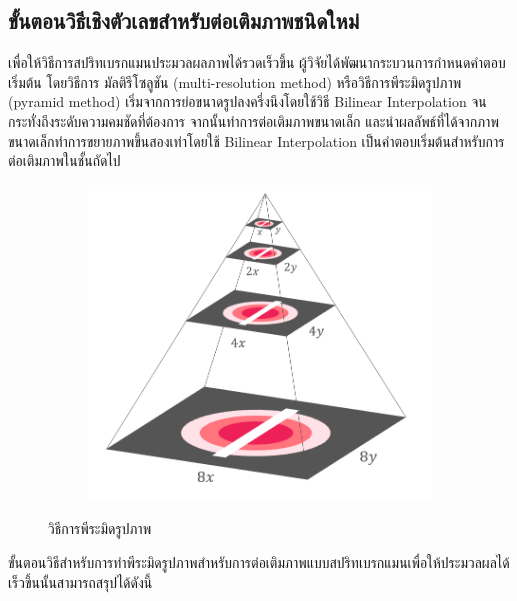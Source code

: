 \subsection{ขั้นตอนวิธีเชิงตัวเลขสำหรับต่อเติมภาพชนิดใหม่}

\hspace{1cm} เพื่อให้วิธีการสปริทเบรกแมนประมวลผลภาพได้รวดเร็วขึ้น ผู้วิจัยได้พัฒนากระบวนการกำหนดคำตอบเริ่มต้น โดยวิธีการ มัลติรีโซลูชัน (multi-resolution method) หรือวิธีการพีระมิดรูปภาพ (pyramid method) \cite{ref:image-pyramid}
	เริ่มจากการย่อขนาดรูปลงครึ่งนึงโดยใช้วิธี Bilinear Interpolation จนกระทั่งถึงระดับความคมชัดที่ต้องการ จากนั้นทำการต่อเติมภาพขนาดเล็ก และนำผลลัพธ์ที่ได้จากภาพขนาดเล็กทำการขยายภาพขึ้นสองเท่าโดยใช้ Bilinear Interpolation เป็นคำตอบเริ่มต้นสำหรับการต่อเติมภาพในชั้นถัดไป
	 	\begin{figure}[H]
	 	\centering
	 	\begin{subfigure}{0.4\linewidth}
	 		\centering
	 		\includegraphics[width=0.8\linewidth]{image/image_inpaint_synthetic/image_pyramid.png}
	 	\end{subfigure}
 		 \caption{วิธีการพีระมิดรูปภาพ}
	 \end{figure}
\hspace{1cm} ขั้นตอนวิธีสำหรับการทำพีระมิดรูปภาพสำหรับการต่อเติมภาพแบบสปริทเบรกแมนเพื่อให้ประมวลผลได้เร็วขึ้นนั้นสามารถสรุปได้ดังนี้

